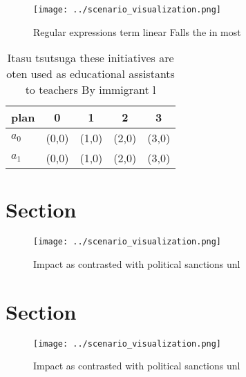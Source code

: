 \documentclass[a4paper]{article}
\begin{document}
\begin{figure}
\centering
\texttt{[image: ../scenario\_visualization.png]}
\caption{Regular expressions term linear Falls the in most
}
\end{figure}
 
\begin{table}
\begin{adjustbox}{width=0.5\columnwidth}
\begin{tabular}{|l|l|l|l|l|}
\hline
\textbf{plan} & \multicolumn{1}{c|}{\textbf{0}} & \multicolumn{1}{c|}{\textbf{1}} & \multicolumn{1}{c|}{\textbf{2}} & \multicolumn{1}{c|}{\textbf{3}} \\ \hline
\textbf{$a_0$}  & (0,0) & (1,0) & (2,0) & (3,0) \\ \hline
\textbf{$a_1$}  & (0,0) & (1,0) & (2,0) & (3,0) \\ \hline
\end{tabular}
\end{adjustbox}
\caption{Itasu tsutsuga these initiatives are oten used as educational assistants to teachers By immigrant l
}
\end{table}

\section{Section}

\begin{figure}
\centering
\texttt{[image: ../scenario\_visualization.png]}
\caption{Impact as contrasted with political sanctions unl
}
\end{figure}
 
\section{Section}

\begin{figure}
\centering
\texttt{[image: ../scenario\_visualization.png]}
\caption{Impact as contrasted with political sanctions unl
}
\end{figure}
 
\end{document}
